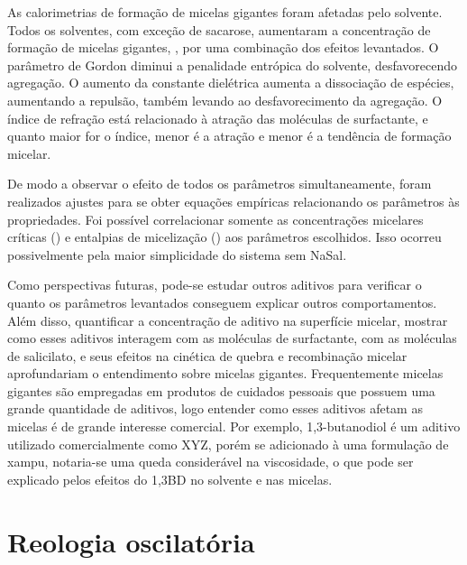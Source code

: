 		As calorimetrias de formação de micelas gigantes foram afetadas pelo solvente. Todos os solventes, com exceção de sacarose, aumentaram a concentração de formação de micelas gigantes, \cwlm, por uma combinação dos efeitos levantados. O parâmetro de Gordon diminui a penalidade entrópica do solvente, desfavorecendo agregação. O aumento da constante dielétrica aumenta a dissociação de espécies, aumentando a repulsão, também levando ao desfavorecimento da agregação. O índice de refração está relacionado à atração das moléculas de surfactante, e quanto maior for o índice, menor é a atração e menor é a tendência de formação micelar.
		
		De modo a observar o efeito de todos os parâmetros simultaneamente, foram realizados ajustes para se obter equações empíricas relacionando os parâmetros às propriedades. Foi possível correlacionar somente as concentrações micelares críticas (\cmc) e entalpias de micelização (\DHmic) aos parâmetros escolhidos. Isso ocorreu possivelmente pela maior simplicidade do sistema sem NaSal.
		
		Como perspectivas futuras, pode-se estudar outros aditivos para verificar o quanto os parâmetros levantados conseguem explicar outros comportamentos. Além disso, quantificar a concentração de aditivo na superfície micelar, mostrar como esses aditivos interagem com as moléculas de surfactante, com as moléculas de salicilato, e seus efeitos na cinética de quebra e recombinação micelar aprofundariam o entendimento sobre micelas gigantes. Frequentemente micelas gigantes são empregadas em produtos de cuidados pessoais que possuem uma grande quantidade de aditivos, logo entender como esses aditivos afetam as micelas é de grande interesse comercial. Por exemplo, 1,3-butanodiol é um aditivo utilizado comercialmente como XYZ, porém se adicionado à uma formulação de xampu, notaria-se uma queda considerável na viscosidade, o que pode ser explicado pelos efeitos do 1,3BD no solvente e nas micelas.

		
	\chapter{Reologia oscilatória}
	\label{sec:reologia_oscilatoria}

